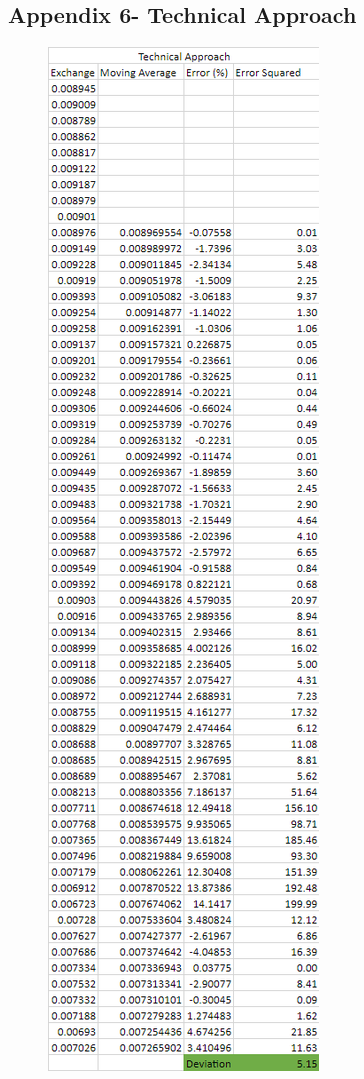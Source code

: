 \documentclass{article}
\let\Oldsubsection\subsection
\renewcommand{\subsection}{\FloatBarrier\Oldsubsection}
\begin{document}
\break

\subsection*{Appendix 6- Technical Approach}


\begin{figure}[h!]
    \centering
    \includegraphics[scale=0.5]{graphs/app6.png}
\end{figure}
\end{document}
